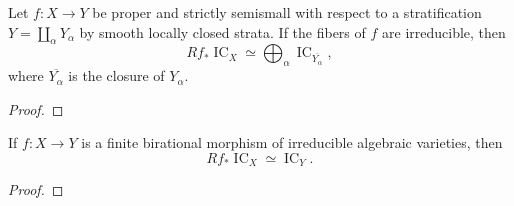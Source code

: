 \begin{lemma}\label{fga-lem-7-5-3}
Let $f:X\to Y$ be proper and strictly semismall with respect to a
stratification $Y=\coprod_\alpha Y_\alpha$ by smooth locally closed strata.  If
the fibers of $f$ are irreducible, then
\[
Rf_*\operatorname{IC}_X\simeq
\bigoplus_\alpha \operatorname{IC}_{\overline{Y_\alpha}},
\]
where $\overline{Y_\alpha}$ is the closure of $Y_\alpha$.
\end{lemma}
\begin{proof}
\notready
\end{proof}

\begin{lemma}\label{fga-lem-7-5-4}\uses{}
If $f:X\to Y$ is a finite birational morphism of irreducible algebraic
varieties, then
\[
Rf_*\operatorname{IC}_X\simeq\operatorname{IC}_Y.
\]
\end{lemma}
\begin{proof}
\notready
\end{proof}
